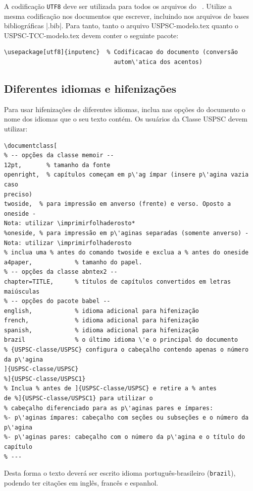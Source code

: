 A codificação \texttt{UTF8} deve ser utilizada para todos os arquivos do \abnTeX\ . Utilize a mesma codificação nos documentos que escrever, incluindo nos arquivos de bases bibliogr\'aficas |.bib|. Para tanto, tanto o arquivo USPSC-modelo.tex  quanto o USPSC-TCC-modelo.tex devem conter o seguinte pacote:

\begin{verbatim}
\usepackage[utf8]{inputenc}	 % Codificacao do documento (conversão
                               autom\'atica dos acentos)
\end{verbatim}

\subsection{Diferentes idiomas e hifenizações}
\label{sec-hifenizacao}

Para usar hifenizações de diferentes idiomas, inclua nas opções do documento o
nome dos idiomas que o seu texto cont\'em. Os usu\'arios da Classe USPSC devem utilizar:

\begin{verbatim}
\documentclass[
% -- opções da classe memoir --
12pt,		% tamanho da fonte
openright,	% capítulos começam em p\'ag ímpar (insere p\'agina vazia caso 
preciso)
twoside,  % para impressão em anverso (frente) e verso. Oposto a oneside - 
Nota: utilizar \imprimirfolhaderosto*
%oneside, % para impressão em p\'aginas separadas (somente anverso) -  
Nota: utilizar \imprimirfolhaderosto
% inclua uma % antes do comando twoside e exclua a % antes do oneside 
a4paper,			% tamanho do papel. 
% -- opções da classe abntex2 --
chapter=TITLE,		% títulos de capítulos convertidos em letras 
maiúsculas
% -- opções do pacote babel --
english,			% idioma adicional para hifenização
french,				% idioma adicional para hifenização
spanish,			% idioma adicional para hifenização
brazil				% o último idioma \'e o principal do documento
% {USPSC-classe/USPSC} configura o cabeçalho contendo apenas o número 
da p\'agina
]{USPSC-classe/USPSC}
%]{USPSC-classe/USPSC1}
% Inclua % antes de ]{USPSC-classe/USPSC} e retire a % antes 
de %]{USPSC-classe/USPSC1} para utilizar o 
% cabeçalho diferenciado para as p\'aginas pares e ímpares:
%- p\'aginas ímpares: cabeçalho com seções ou subseções e o número da p\'agina
%- p\'aginas pares: cabeçalho com o número da p\'agina e o título do capítulo 
% ---
\end{verbatim}

Desta forma o texto dever\'a ser escrito idioma portugu\^es-brasileiro (\texttt{brazil}), podendo ter citações em ingl\^es, franc\^es e espanhol.

